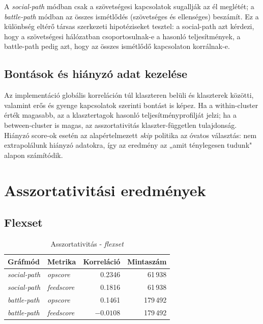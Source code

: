 A \textit{social-path} módban csak a szövetségesi kapcsolatok sugallják az él meglétét; a \textit{battle-path} módban az összes ismétlődés (szövetséges és ellenséges) beszámít. Ez a különbség eltérő társas szerkezeti hipotéziseket tesztel: a social-path azt kérdezi, hogy a szövetségesi hálózatban csoportosulnak-e a hasonló teljesítmények, a battle-path pedig azt, hogy az összes ismétlődő kapcsolaton korrálnak-e.

\subsection{Bontások és hiányzó adat kezelése}

Az implementáció globális korreláción túl klaszteren belüli és klaszterek közötti, valamint erős és gyenge kapcsolatok szerinti bontást is képez. Ha a within-cluster érték magasabb, az a klasztertagok hasonló teljesítményprofilját jelzi; ha a between-cluster is magas, az asszortativitás klaszter-független tulajdonság. Hiányzó score-ok esetén az alapértelmezett \textit{skip} politika az óvatos választás: nem extrapolálunk hiányzó adatokra, így az eredmény az „amit ténylegesen tudunk" alapon számítódik.

\section{Asszortativitási eredmények}

\subsection{Flexset}

\begin{table}[H]
\centering
\caption{Asszortativitás - \textit{flexset}}
\begin{tabular}{llrr}
\toprule
\textbf{Gráfmód} & \textbf{Metrika} & \textbf{Korreláció} & \textbf{Mintaszám} \\
\midrule
\textit{social-path} & \textit{opscore} & 0.2346 & 61\,938 \\
\textit{social-path} & \textit{feedscore} & 0.1816 & 61\,938 \\
\textit{battle-path} & \textit{opscore} & 0.1461 & 179\,492 \\
\textit{battle-path} & \textit{feedscore} & $-0.0108$ & 179\,492 \\
\bottomrule
\end{tabular}
\end{table}

